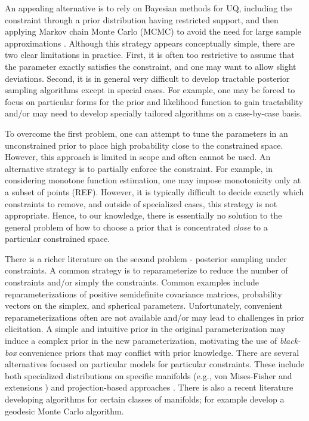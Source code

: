 \documentclass[10pt,fleqn]{article}
\DeclareMathOperator{\1}{\mathbbm{1}} \DeclareMathOperator{\bigO}{\mc O}
\begin{document}
An appealing alternative is to rely on Bayesian
methods for UQ, including the constraint through a prior distribution
having restricted support, and then applying Markov chain Monte Carlo
(MCMC) to avoid the need for large sample approximations \citep{gelfand1992bayesian}. Although 
this strategy appears conceptually simple, there are two clear limitations
in practice.  First, it is often too restrictive to assume that the parameter
exactly satisfies the constraint, and one may want to allow slight deviations.
Second, it is in general very difficult to 
develop tractable posterior sampling algorithms except in special cases.
For example, one may be forced to focus on particular forms for the prior
and likelihood function to gain tractability and/or may need to develop
specially tailored algorithms on a case-by-case basis.  

To overcome the first problem, one can attempt to tune the parameters in an
unconstrained prior to place high probability close to the constrained space.
However, this approach is limited in scope and often cannot be used.
An alternative strategy is to partially enforce the constraint.  For example, 
in considering monotone function estimation, one may impose monotonicity only at 
a subset of points (REF).  However, it is typically difficult to decide exactly which constraints to remove, and 
outside of specialized cases, this strategy is not appropriate.  Hence, to our 
knowledge, there is essentially no solution to the general problem of how to choose a prior
that is concentrated {\em close} to a particular constrained space.  

There is a richer literature on the second problem - posterior sampling under constraints.  
A common strategy is to reparameterize to reduce the number of constraints and/or simply the constraints.  
Common examples include reparameterizations of positive semidefinite covariance
matrices, probability vectors on the simplex, and spherical parameters.
Unfortunately, convenient reparameterizations often are not available and/or may
lead to challenges in prior elicitation.  A simple and intuitive prior in the original parameterization
may induce a complex prior in the new parameterization, motivating the use of
{\em black-box} convenience priors that may conflict with prior knowledge.  There are several 
alternatives focused on particular models for particular constraints.  These include both 
specialized distributions on specific manifolds (e.g., von Mises-Fisher and extensions \citep{khatri1977mises,hoff2009simulation}) and projection-based approaches \citep{lin2014monogp}.  
There is also a recent literature developing algorithms for certain classes of manifolds; for example \cite{byrne2013geodesic} develop a geodesic Monte Carlo algorithm.
\end{document}
